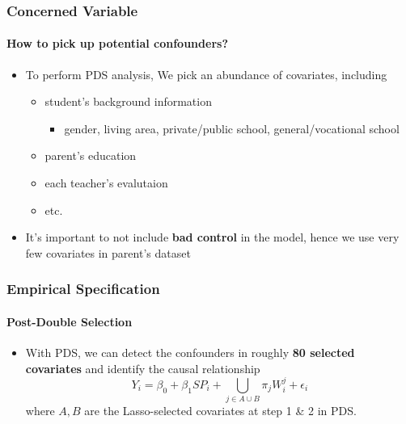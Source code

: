 \documentclass{beamer}
\begin{document}
\begin{frame} %
\frametitle{Concerned Variable}
\framesubtitle{How to pick up potential confounders?}

    \begin{itemize}
        \item To perform PDS analysis, We pick an abundance of covariates, including 
            \begin{itemize}
                \item student's background information
                \begin{itemize}
                    \item gender, living area, private/public school, general/vocational school
                \end{itemize}        
                \item parent's education
                \item each teacher's evalutaion 
                \item etc. 
            \end{itemize}
        \item It's important to not include \textbf{bad control} in the model, hence we use very few covariates in parent's dataset
    \end{itemize}

\end{frame}


\begin{frame} %
\frametitle{Empirical Specification}
\framesubtitle{Post-Double Selection}

    \begin{itemize}
        \item With PDS, we can detect the confounders in roughly \textbf{80 selected covariates} and identify the causal relationship
        \[
        Y_i = \beta_0 + \beta_1 \textit{SP}_i + \bigcup_{j \in A \cup B} \pi_j W_i^j + \epsilon_i
        \]
        where $A,B$ are the Lasso-selected covariates at step 1 \& 2 in PDS.
    \end{itemize}

\end{frame}
    
\end{document}
